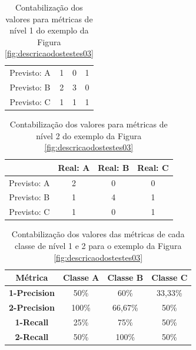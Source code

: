 {\begin{table}[h!]
\begin{center}
\begin{tabular}{cccc}
      Previsto: A & 1 & 0 & 1\\
      Previsto: B & 2 & 3 & 0\\
      Previsto: C & 1 & 1 & 1\\

      \hline
    \end{tabular}
    \caption{Contabilização dos valores para métricas de nível 1 do exemplo da Figura \ref{fig:descricaodostestes03}}
    \label{tab:confusao1}
  \end{center}
\end{table}

\begin{table}[h!]
  \begin{center}
    \begin{tabular}{cccc}
      \hline
         & \textbf{Real: A} & \textbf{Real: B} & \textbf{Real: C} \\
      \hline

      Previsto: A & 2 & 0 & 0\\
      Previsto: B & 1 & 4 & 1\\
      Previsto: C & 1 & 0 & 1\\

      \hline
    \end{tabular}
    \caption{Contabilização dos valores para métricas de nível 2 do exemplo da Figura \ref{fig:descricaodostestes03}}
    \label{tab:confusao2}
  \end{center}
\end{table}

\begin{table}[h!]
  \begin{center}
    \begin{tabular}{cccc}
      \hline
       Métrica  & \textbf{Classe A} & \textbf{Classe B} & \textbf{Classe C} \\
      \hline

      \textbf{1-Precision} & 50\% & 60\% & 33,33\% \\
      \textbf{2-Precision} & 100\% & 66,67\% & 50\% \\
      \textbf{1-Recall} & 25\% & 75\% & 50\% \\
      \textbf{2-Recall} & 50\% & 100\% & 50\% \\
      
      \hline
    \end{tabular}
    \caption{Contabilização dos valores das métricas de cada classe de nível 1 e 2 para o exemplo da Figura \ref{fig:descricaodostestes03}}
    \label{tab:valores_classes}
  \end{center}
\end{table}

}
